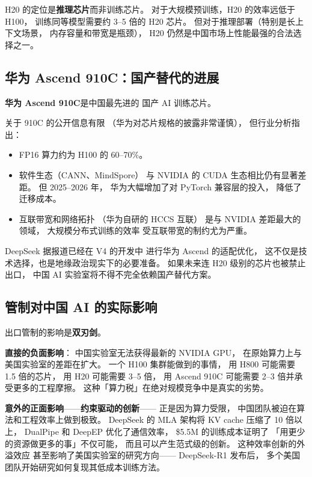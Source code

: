 H20 的定位是\textbf{推理芯片}而非训练芯片。
对于大规模预训练，H20 的效率远低于 H100，
训练同等模型需要约 3--5 倍的 H20 芯片。
但对于推理部署（特别是长上下文场景，
内存容量和带宽是瓶颈），
H20 仍然是中国市场上性能最强的合法选择之一。

\subsection{华为 Ascend 910C：国产替代的进展}

\textbf{华为 Ascend 910C}是中国最先进的
国产 AI 训练芯片。

关于 910C 的公开信息有限
（华为对芯片规格的披露非常谨慎），
但行业分析指出：
\begin{itemize}[noitemsep]
  \item FP16 算力约为 H100 的 60--70\%。
  \item 软件生态（CANN、MindSpore）
        与 NVIDIA 的 CUDA 生态相比仍有显著差距。
        但 2025--2026 年，
        华为大幅增加了对 PyTorch 兼容层的投入，
        降低了迁移成本。
  \item 互联带宽和网络拓扑
        （华为自研的 HCCS 互联）
        是与 NVIDIA 差距最大的领域，
        大规模分布式训练的效率
        受互联带宽的制约尤为严重。
\end{itemize}

DeepSeek 据报道已经在 V4 的开发中
进行华为 Ascend 的适配优化，
这不仅是技术选择，也是地缘政治现实下的必要准备。
如果未来连 H20 级别的芯片也被禁止出口，
中国 AI 实验室将不得不完全依赖国产替代方案。

\subsection{管制对中国 AI 的实际影响}

出口管制的影响是\textbf{双刃剑}。

\textbf{直接的负面影响}：
中国实验室无法获得最新的 NVIDIA GPU，
在原始算力上与美国实验室的差距在扩大。
一个 H100 集群能做到的事情，
用 H800 可能需要 1.5 倍的芯片，
用 H20 可能需要 3--5 倍，
用 Ascend 910C 可能需要 2--3 倍并承受更多的工程摩擦。
这种「算力税」在绝对规模竞争中是真实的劣势。

\textbf{意外的正面影响}——\textbf{约束驱动的创新}——
正是因为算力受限，
中国团队被迫在算法和工程效率上做到极致。
DeepSeek 的 MLA 架构将 KV cache 压缩了 10 倍以上，
DualPipe 和 DeepEP 优化了通信效率，
\$5.5M 的训练成本证明了
「用更少的资源做更多的事」不仅可能，
而且可以产生范式级的创新。
这种效率创新的外溢效应
甚至影响了美国实验室的研究方向——
DeepSeek-R1 发布后，
多个美国团队开始研究如何复现其低成本训练方法。

